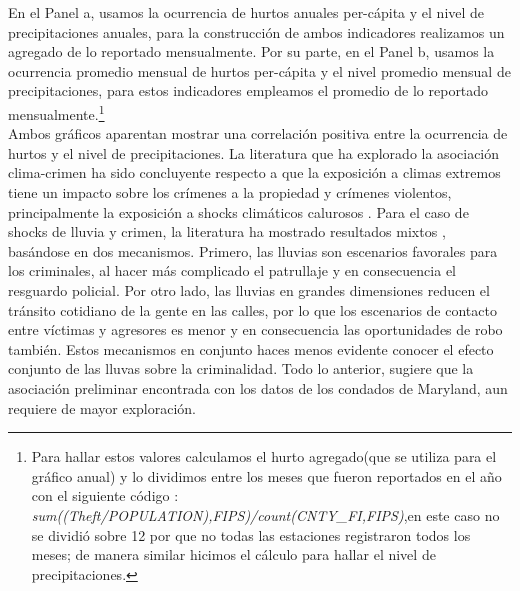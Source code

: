 \documentclass[11pt,a4paper]{article}
\begin{document}
En el Panel a, usamos la ocurrencia de hurtos anuales per-cápita y el nivel de precipitaciones anuales, para la construcción de ambos indicadores realizamos un agregado de lo reportado mensualmente. Por su parte, en el Panel b, usamos la ocurrencia promedio mensual de hurtos per-cápita y el nivel promedio mensual de precipitaciones, para estos indicadores empleamos el promedio de lo reportado mensualmente.\footnote{ Para hallar estos valores calculamos el hurto agregado(que se utiliza para el  gráfico anual) y lo dividimos entre los meses que fueron reportados en el año con el siguiente código :  \emph{sum((Theft/POPULATION),FIPS)/count(CNTY\_FI,FIPS)},en este caso no se dividió sobre 12 por que no todas las estaciones registraron todos los meses; de manera similar hicimos el cálculo para hallar el nivel de precipitaciones. }
\\
Ambos gráficos aparentan mostrar una correlación positiva entre la ocurrencia de hurtos y el nivel de precipitaciones. La literatura que ha explorado la asociación clima-crimen ha sido concluyente respecto a que la exposición a climas extremos tiene un impacto sobre los crímenes a la propiedad y crímenes violentos, principalmente la exposición a shocks climáticos calurosos \cite{blakeslee_weather_2018,cohn_weather_1990,trujillo_effect_2021}. Para el caso de shocks de lluvia y crimen, la literatura ha mostrado resultados mixtos \cite{blakeslee_weather_2018,field_effect_1992,schutte_influence_2018}, basándose en dos mecanismos. Primero, las lluvias son escenarios favorales para los criminales, al hacer más complicado el patrullaje y en consecuencia el resguardo policial. Por otro lado, las lluvias en grandes dimensiones reducen el tránsito cotidiano de la gente en las calles, por lo que los escenarios de contacto entre víctimas y agresores es menor y en consecuencia las oportunidades de robo también. Estos mecanismos en conjunto haces menos evidente conocer el efecto conjunto de las lluvas sobre la criminalidad. Todo lo anterior, sugiere que la asociación preliminar encontrada con los datos de los condados de Maryland, aun requiere de mayor exploración.
\end{document}

